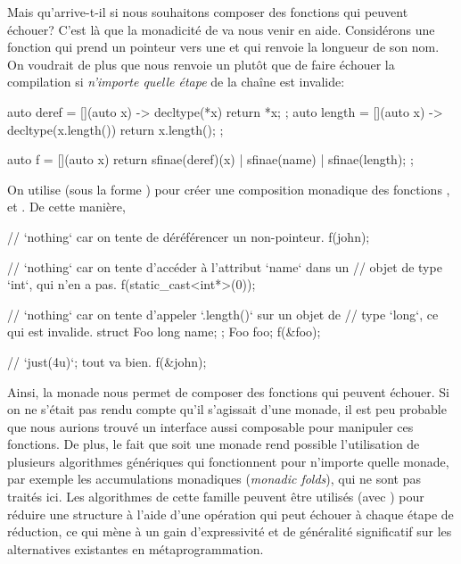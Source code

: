 Mais qu'arrive-t-il si nous souhaitons composer des fonctions qui peuvent
échouer? C'est là que la monadicité de  va nous venir en aide.
Considérons  une fonction qui prend un pointeur vers une 
et qui renvoie la longueur de son nom. On voudrait de plus que  nous
renvoie un  plutôt que de faire échouer la compilation si
\textit{n'importe quelle étape} de la chaîne est invalide:
\begin{cpp}
    auto deref = [](auto x) -> decltype(*x) { return *x; };
    auto length = [](auto x) -> decltype(x.length()) { return x.length(); };

    auto f = [](auto x) {
        return sfinae(deref)(x) | sfinae(name)
                                | sfinae(length);
    };
\end{cpp}

On utilise  (sous la forme ) pour créer une
composition monadique des fonctions , 
et . De cette manière,
\begin{cpp}
    // `nothing` car on tente de déréférencer un non-pointeur.
    f(john);

    // `nothing` car on tente d'accéder à l'attribut `name` dans un
    // objet de type `int`, qui n'en a pas.
    f(static_cast<int*>(0));

    // `nothing` car on tente d'appeler `.length()` sur un objet de
    // type `long`, ce qui est invalide.
    struct Foo { long name; };
    Foo foo;
    f(&foo);

    // `just(4u)`; tout va bien.
    f(&john);
\end{cpp}

Ainsi, la monade  nous permet de composer des fonctions qui peuvent
échouer. Si on ne s'était pas rendu compte qu'il s'agissait d'une monade, il
est peu probable que nous aurions trouvé un interface aussi composable pour
manipuler ces fonctions. De plus, le fait que  soit une monade
rend possible l'utilisation de plusieurs algorithmes génériques qui
fonctionnent pour n'importe quelle monade, par exemple les accumulations
monadiques (\textit{monadic folds}), qui ne sont pas traités ici. Les
algorithmes de cette famille peuvent être utilisés (avec ) pour
réduire une structure à l'aide d'une opération qui peut échouer à chaque
étape de réduction, ce qui mène à un gain d'expressivité et de généralité
significatif sur les alternatives existantes en métaprogrammation.


